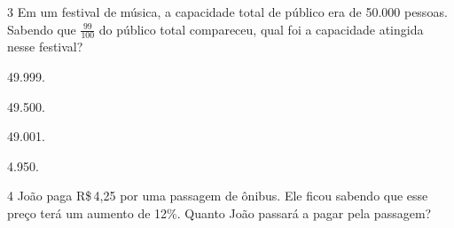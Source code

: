 







\num{3} Em um festival de música, a capacidade total de público era de 50.000
pessoas. Sabendo que $\frac{99}{100}$ do público total compareceu,
qual foi a capacidade atingida nesse festival?

\begin{escolha}
\item 49.999.
\item 49.500.
\item 49.001.
\item 4.950.
\end{escolha}







\pagebreak

\num{4} João paga R\$\,4,25 por uma passagem de ônibus. Ele ficou sabendo que
esse preço terá um aumento de 12\%. Quanto João passará a pagar pela
passagem?

